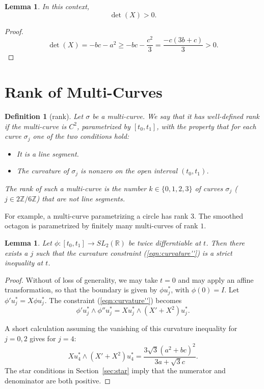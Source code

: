 \documentclass[11pt]{amsart}
\newtheorem{definition}[equation]{Definition}
\newtheorem{lemma}[equation]{Lemma}
\newcommand{\ring}[1]{\mathbb{#1}}
\def\rZ{{\ring{Z}}}
\begin{document}
\begin{lemma}
In this context,
\[\det(X) > 0.\]
\end{lemma}

\begin{proof} 
\[
\det(X) = - b c - a^2 \ge - b c  - \frac{c^2}{3} = \frac{-c(3 b + c)}{3} >0.
\]
\end{proof}



\section{Rank of Multi-Curves}


\begin{definition}[rank]\label{def:rank}
Let $\sigma$ be a multi-curve.  We say that
it has {\it well-defined rank} if the multi-curve is $C^2$,
parametrized by $[t_0,t_1]$, with
the property that for each curve $\sigma_j$ one of the two conditions
hold:
\begin{itemize}
\item It is a line segment.
\item The curvature of $\sigma_j$
is nonzero on the open interval $(t_0,t_1)$.
\end{itemize}
The {\it rank} of such a multi-curve is the number $k\in\{0,1,2,3\}$
of curves $\sigma_{j}$ ($j\in2\rZ/6\rZ$) that are {\it not} line
segments.
\end{definition}
For example, a multi-curve parametrizing a circle
has rank $3$.  The smoothed octagon is parametrized by finitely many
multi-curves of rank $1$.  


\begin{lemma}\label{lemma:curvature}  
  Let $\phi:[t_0,t_1]\to SL_2(\ring{R})$ be twice differntiable at $t$.
  Then 
  there exists a $j$ such that the curvature constraint
  (\ref{eqn:curvature''}) is a strict inequality at $t$.
\end{lemma}

\begin{proof}  %
    Without of loss of generality, we may take $t=0$ and may apply an affine
  transformation, so that the boundary is given by $\phi u^*_j$, with
  $\phi(0)=I$.  Let $\phi' u^*_j = X\phi u^*_j$.  
The constraint (\ref{eqn:curvature''}) becomes
\[
\phi' u^*_j \land \phi'' u^*_j = X u^*_j \land (X' + X^2) u^*_j.
\]

A short calculation
assuming the vanishing of this curvature inequality for $j=0,2$ gives for $j=4$:
\[
X u^*_4 \land (X' + X^2) u^*_4 = \frac{3\sqrt{3} (a^2 + b c)^2}{3 a + \sqrt{3} c}.
\]
The star conditions in Section~\ref{sec:star} imply that the numerator
and denominator are both positive.
\end{proof}
\end{document}
